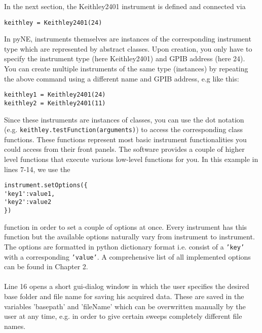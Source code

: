 In the next section, the Keithley2401 instrument is defined and connected via
\begin{verbatim}
keithley = Keithley2401(24)
\end{verbatim}
In pyNE, instruments themselves are instances of the corresponding instrument type which are represented by abstract classes. Upon creation, you only have to specify the instrument type (here Keithley2401) and GPIB address (here 24). You can create multiple instruments of the same type (instances) by repeating the above command using a different name and GPIB address, e.g like this: 
\begin{verbatim}
keithley1 = Keithley2401(24)
keithley2 = Keithley2401(11)
\end{verbatim}
Since these instruments are instances of classes, you can use the dot notation (e.g. \texttt{keithley.testFunction(arguments)}) to access the corresponding class functions. These functions represent most basic instrument functionalities you could access from their front panels. The software provides a  couple of higher level functions that execute various low-level functions for you. In this example in lines 7-14, we use the
\begin{verbatim}
instrument.setOptions({
'key1':value1,
'key2':value2
})
\end{verbatim}  function in order to set a couple of options at once. Every instrument has this function but the available options naturally vary from instrument to instrument. The options are formatted in python dictionary format i.e. consist of a \texttt{'key'} with a corresponding \texttt{'value'}. A comprehensive list of all implemented options can be found in Chapter 2. \\
\\
Line 16 opens a short gui-dialog window in which the user specifies the desired base folder and file name for saving his acquired data. These are saved in the variables 'basepath' and 'fileName' which can be overwritten manually by the user at any time, e.g. in order to give certain sweeps completely different file names.\\
\\ 
